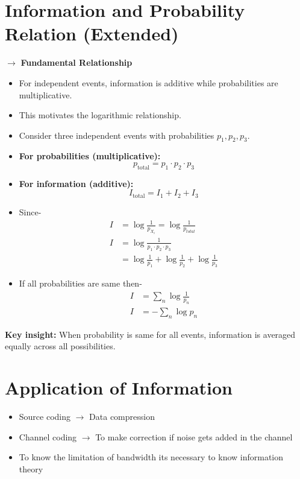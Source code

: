 \documentclass[11pt,a4paper]{book}
\newenvironment{derivationbox}[1][Derivation]{
    \begin{tcolorbox}[
        enhanced,
        breakable,
        colback=softpeach!10,
        colframe=softpeach!200,
        title=#1,
        fonttitle=\bfseries,
        sharp corners,
        boxrule=0.8pt,
        left=10pt,
        right=10pt,
        top=8pt,
        bottom=8pt
    ]
}{
    \end{tcolorbox}
}
\begin{document}
\section{Information and Probability Relation (Extended)}

$\rightarrow$ \textbf{Fundamental Relationship} 
\begin{itemize}
    \item For independent events, information is additive while probabilities are multiplicative.
    \item This motivates the logarithmic relationship.
\end{itemize}  

\begin{derivationbox}[Cause of Logarithm for Information]
\begin{itemize}[label=$\rightarrow$]
    \item Consider three independent events with probabilities \(p_1, p_2, p_3\).
    \item \textbf{For probabilities (multiplicative):}
    \[
    p_{\text{total}} = p_1 \cdot p_2 \cdot p_3
    \]
    \item \textbf{For information (additive):}
    \[
    I_{\text{total}} = I_1 + I_2 + I_3
    \]
    \item  Since-
    \begin{align*}
    I &= \log \frac{1}{p_{X_i}} = \log \frac{1}{p_{total}}\\
    I &= \log \frac{1}{p_1 \cdot p_2 \cdot p_3} \\
    &= \log \frac{1}{p_1} + \log \frac{1}{p_2} + \log \frac{1}{p_3}
    \end{align*}
    \item If all probabilities are same then-
    \begin{align*}
        I &= \sum_{n} \log \frac{1}{p_n}\\
        I &= -\sum_{n} \log p_n
    \end{align*}
\end{itemize}
\textbf{Key insight:} When probability is same for all events, information is averaged equally across all possibilities.
\end{derivationbox}

\section{Application of Information}
\begin{itemize}
    \item Source coding $\rightarrow$ Data compression
    \item Channel coding $\rightarrow$ To make correction if noise gets added in the channel
    \item To know the limitation of bandwidth its necessary to know information theory
\end{itemize}
\end{document}
